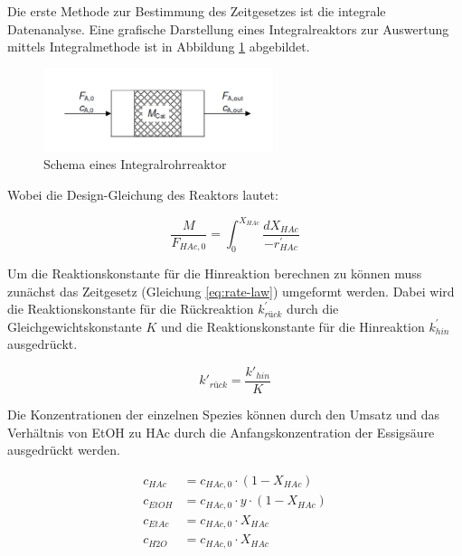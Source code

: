\documentclass[12pt,liststotoc]{report}
\begin{document}
Die erste Methode zur Bestimmung des Zeitgesetzes ist die integrale Datenanalyse. Eine grafische Darstellung eines Integralreaktors zur Auswertung mittels Integralmethode ist in Abbildung \ref{Integralreactor} abgebildet. 


\begin{figure}[H]
\centering
\includegraphics[width=0.6\textwidth]{Graphics/integralreactor.PNG} 
\caption[Schema eines Integralrohrreaktors]{Schema eines Integralrohrreaktor \cite{Skript_2018}}
\label{Integralreactor}
\end{figure}
\noindent
Wobei die Design-Gleichung des Reaktors lautet:

\begin{equation}
\label{eq:design_int}
\frac{M}{F_{HAc,0}}=\int_{0}^{X_{HAc}} \frac{dX_{HAc}}{-r^{'}_{HAc}}
\end{equation}

Um die Reaktionskonstante für die Hinreaktion berechnen zu können muss zunächst das Zeitgesetz (Gleichung \ref{eq:rate-law}) umgeformt werden. Dabei wird die Reaktionskonstante für die Rückreaktion $k_{rück}^'$ durch die Gleichgewichtskonstante $K$ und die Reaktionskonstante für die Hinreaktion $k_{hin}^'$ ausgedrückt.

\begin{equation}
\label{eq:eq-rate-const}
k'_{rück}=\frac{k'_{hin}}{K}
\end{equation}

Die Konzentrationen der einzelnen Spezies können durch den Umsatz und das Verhältnis von EtOH zu HAc durch die Anfangskonzentration der Essigsäure ausgedrückt werden.

\begin{align*}
    c_{HAc} &= c_{HAc, 0} \cdot (1 - X_{HAc})\\
    c_{EtOH} &= c_{HAc, 0} \cdot y \cdot (1 - X_{HAc})\\
    c_{EtAc} &= c_{HAc, 0} \cdot X_{HAc} \\
    c_{H2O} &= c_{HAc, 0} \cdot X_{HAc}
\end{align*}
\end{document}
